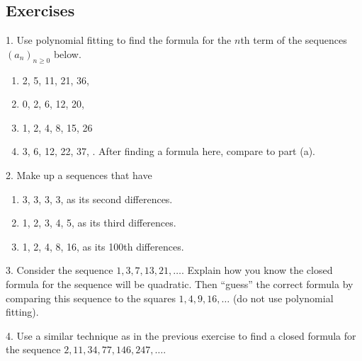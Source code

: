 \documentclass[10pt,]{book}
\theoremstyle{plain}
\theoremstyle{definition}
\theoremstyle{definition}
\theoremstyle{definition}
\theoremstyle{definition}
\numberwithin{equation}{chapter}
\begin{document}
\subsection[{Exercises}]{Exercises}\label{exercises_seq-polyfit}
\begin{exerciselist}
\item[1.]\hypertarget{exercise-23}{}\hypertarget{p-256}{}%
Use polynomial fitting to find the formula for the \(n\)th term of the sequences \((a_n)_{n \ge 0}\) below.%
\par
\hypertarget{p-257}{}%
\leavevmode%
\begin{enumerate}[label=(\alph*)]
\item\hypertarget{li-165}{}\hypertarget{p-258}{}%
2, 5, 11, 21, 36,\textellipsis{}%
\item\hypertarget{li-166}{}\hypertarget{p-259}{}%
0, 2, 6, 12, 20,\textellipsis{}%
\item\hypertarget{li-167}{}\hypertarget{p-260}{}%
1, 2, 4, 8, 15, 26 \textellipsis{}%
\item\hypertarget{li-168}{}\hypertarget{p-261}{}%
3, 6, 12, 22, 37, \textellipsis{}.  After finding a formula here, compare to part (a).%
\end{enumerate}
%
\par\smallskip
\item[2.]\hypertarget{exercise-24}{}\hypertarget{p-264}{}%
Make up a sequences that have \leavevmode%
\begin{enumerate}[label=(\alph*)]
\item\hypertarget{li-171}{}3, 3, 3, 3, \textellipsis{} as its second differences.%
\item\hypertarget{li-172}{}1, 2, 3, 4, 5, \textellipsis{} as its third differences.%
\item\hypertarget{li-173}{}1, 2, 4, 8, 16, \textellipsis{} as its 100th differences.%
\end{enumerate}
%
\par\smallskip
\item[3.]\hypertarget{exercise-25}{}\hypertarget{p-265}{}%
Consider the sequence \(1, 3, 7, 13, 21, \ldots\). Explain how you know the closed formula for the sequence will be quadratic. Then ``guess'' the correct formula by comparing this sequence to the squares \(1, 4, 9, 16, \ldots\) (do not use polynomial fitting).%
\par\smallskip
\item[4.]\hypertarget{exercise-26}{}\hypertarget{p-268}{}%
Use a similar technique as in the previous exercise to find a closed formula for the sequence \(2, 11, 34, 77, 146, 247,\ldots\).%

\end{exerciselist}
\end{document}

